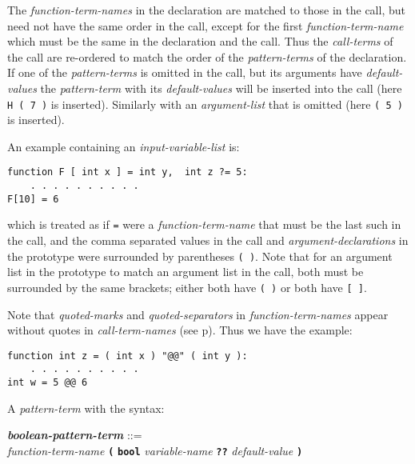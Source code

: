 \documentclass[12pt]{article}
\newcommand{\TT}[1]{{\tt \bfseries #1}}
\newcommand{\emkey}[1]{{\em \bfseries #1}}
\newcommand{\pagref}[1]{p\pageref{#1}}
\newenvironment{indpar}[1][0.3in]%
	{\begin{list}{}%
		     {\setlength{\itemsep}{0in}%
		      \setlength{\topsep}{0in}%
		      \setlength{\parsep}{1ex}%
		      \setlength{\labelwidth}{#1}%
		      \setlength{\leftmargin}{#1}%
		      \addtolength{\leftmargin}{\labelsep}}%
	 \item}%
	{\end{list}}
\begin{document}
The {\em function-term-names} in the declaration are matched to those
in the call, but need not have the same order in the call, except for
the first {\em function-term-name} which must be the same in the
declaration and the call.  Thus the {\em call-terms} of the call
are re-ordered to match the order of the {\em pattern-terms} of the
declaration.  If one of the {\em pattern-terms} is omitted in the
call, but its arguments have {\em default-values}
the {\em pattern-term} with its
{\em default-values} will be inserted into the call
(here {\tt H ( 7 )} is inserted).
Similarly with an {\em argument-list} that is omitted
(here {\tt ( 5 )} is inserted).

An example containing an {\em input-variable-list} is:
\begin{indpar}\begin{verbatim}
function F [ int x ] = int y,  int z ?= 5:
    . . . . . . . . . .
F[10] = 6
\end{verbatim}\end{indpar}
which is treated as if {\tt =} were a {\em function-term-name}
that must be the last such in the call, and the comma separated
values in the call and {\em argument-declarations} in the prototype
were surrounded by parentheses {\tt (~)}.  Note that for an argument
list in the prototype to match an argument list in the call, both
must be surrounded by the same brackets; either both have {\tt (~)}
or both have {\tt [~]}.

Note that {\em quoted-marks} and {\em quoted-separators}
in {\em function-term-names} appear without quotes in {\em call-term-names}
(see \pagref{CALL-TERM-NAME}).  Thus we have the example:
\begin{indpar}\begin{verbatim}
function int z = ( int x ) "@@" ( int y ):
    . . . . . . . . . .
int w = 5 @@ 6
\end{verbatim}\end{indpar}

A {\em pattern-term} with the syntax:
\begin{indpar}
\emkey{boolean-pattern-term}\label{BOOLEAN-PATTERN-TERM} ::= \\
\hspace*{1in} {\em function-term-name} \TT{(}
        \TT{bool} {\em variable-name}
	\TT{??} {\em default-value} \TT{)}
\end{indpar}
\end{document}
